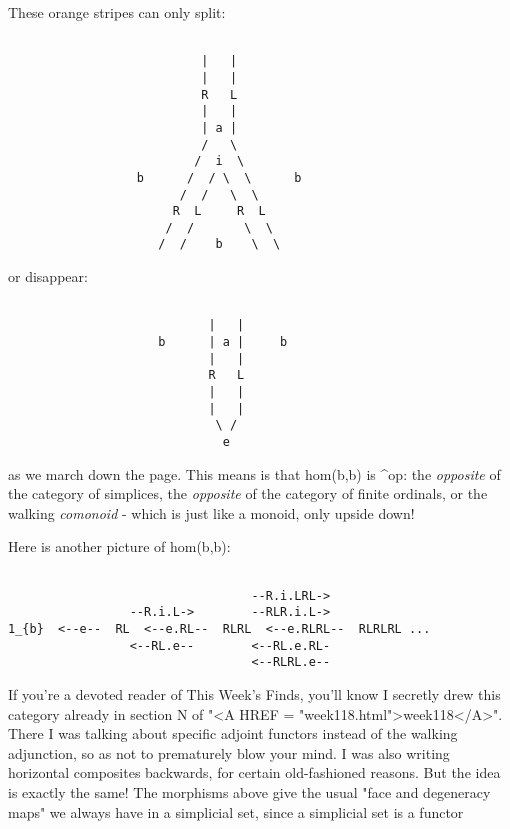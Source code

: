 These orange stripes can only split:


\begin{verbatim}

                           |   |
                           |   |   
                           R   L
                           |   |
                           | a |
                           /   \                           
                          /  i  \
                  b      /  / \  \      b
                        /  /   \  \
                       R  L     R  L
                      /  /       \  \
                     /  /    b    \  \ 
\end{verbatim}
    
or disappear:


\begin{verbatim}

                            |   |    
                     b      | a |     b 
                            |   |
                            R   L   
                            |   |
                            |   |
                             \ /
                              e
\end{verbatim}
    
as we march down the page.  This means is that hom(b,b) is
\Delta ^{op}: the \emph{opposite} of the category of simplices, the 
\emph{opposite} of the category of finite ordinals, or the walking
\emph{comonoid} - which is just like a monoid, only upside down!  

Here is another picture of hom(b,b):


\begin{verbatim}

                                  --R.i.LRL->
                 --R.i.L->        --RLR.i.L->
1_{b}  <--e--  RL  <--e.RL--  RLRL  <--e.RLRL--  RLRLRL ...
                 <--RL.e--        <--RL.e.RL-
                                  <--RLRL.e--
\end{verbatim}
    
If you're a devoted reader of This Week's Finds, you'll know I secretly
drew this category already in section N of "<A HREF = "week118.html">week118</A>".  There I was
talking about specific adjoint functors instead of the walking
adjunction, so as not to prematurely blow your mind.   I was also
writing horizontal composites backwards, for certain old-fashioned
reasons.  But the idea is exactly the same!  The morphisms above give
the usual "face and degeneracy maps" we always have in a simplicial set,
since a simplicial set is a functor

